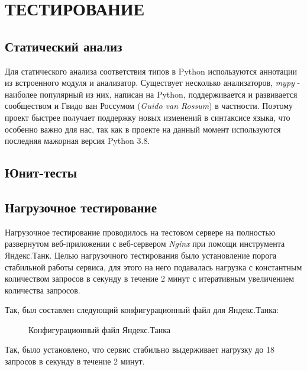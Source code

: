 \section{ТЕСТИРОВАНИЕ}
    \subsection{Статический анализ}
    Для статического анализа соответствия типов в Python используются аннотации 
    из встроенного модуля  и анализатор.
    Существует несколько анализаторов, \textit{mypy}\cite{mypy} - наиболее популярный из
    них, написан на Python, поддерживается и развивается сообществом
    и Гвидо ван Россумом (\textit{Guido van Rossum}\cite{guido.van.rossum})
    в частности. Поэтому проект быстрее получает поддержку новых изменений в
    синтаксисе языка, что особенно важно для нас, так как в проекте на данный
    момент используются последняя мажорная версия Python 3.8.

    \subsection{Юнит-тесты}

    \subsection{Нагрузочное тестирование}
    Нагрузочное тестирование проводилось на тестовом сервере на полностью
    развернутом веб-приложении с веб-сервером \textit{Nginx} при помощи
    инструмента Яндекс.Танк. Целью нагрузочного тестирования было установление
    порога стабильной работы сервиса, для этого на него подавалась нагрузка
    с константным количеством запросов в секунду в течение 2 минут с итеративным
    увеличением количества запросов.

    Так, был составлен следующий конфигурационный файл для Яндекс.Танка:
    \begin{figure}[H]
        \centering
        
        \caption{Конфигурационный файл Яндекс.Танка}
        \label{fig:tank_load}
    \end{figure}

    Так, было установлено, что сервис стабильно выдерживает нагрузку до 18
    запросов в секунду в течение 2 минут.
